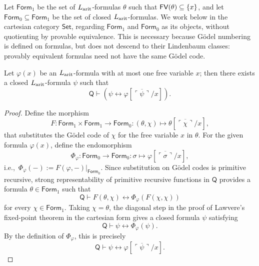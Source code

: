 \begin{notation}
    Let $\mathsf{Form}_1$ be the set of $L_{\textnormal{arit}}$-formulas $\theta$ such that $\textsf{FV}(\theta)\subseteq\{x\}$, and let $\mathsf{Form}_0\subseteq\mathsf{Form}_1$ be the set of closed $L_{\textnormal{arit}}$-formulas.
    We work below in the cartesian category $\mathsf{Set}$, regarding $\mathsf{Form}_1$ and $\mathsf{Form}_0$ as its objects, without quotienting by provable equivalence. This is necessary because Gödel numbering is defined on formulas, but does not descend to their Lindenbaum classes: provably equivalent formulas need not have the same Gödel code.
\end{notation}

\begin{theorem}
    Let $\varphi(x)$ be an $L_{\textnormal{arit}}$-formula with at most one free variable $x$; then there exists a closed $L_{\textnormal{arit}}$-formula $\psi$ such that
    \[ \mathsf Q \vdash \left(\psi \leftrightarrow \varphi[\overline{\ulcorner\psi\urcorner}/x]\right). \]
\end{theorem}

\begin{proof}
    Define the morphism
    \[ F : \mathsf{Form}_1\times\mathsf{Form}_1\to\mathsf{Form}_0 : (\theta,\chi)\mapsto\theta[\overline{\ulcorner\chi\urcorner}/x], \]
    that substitutes the Gödel code of $\chi$ for the free variable $x$ in $\theta$. For the given formula $\varphi(x)$, define the endomorphism
    \[ \Phi_\varphi : \mathsf{Form}_0\to\mathsf{Form}_0 : \sigma\mapsto\varphi[\overline{\ulcorner\sigma\urcorner}/x], \]
    i.e.,\ $\Phi_\varphi(-) := F(\varphi,-)|_{\mathsf{Form}_0}$.
    Since substitution on Gödel codes is primitive recursive, strong representability of primitive recursive functions in $\mathsf Q$ provides a formula $\theta\in\mathsf{Form}_1$ such that
    \[ \mathsf Q\vdash F(\theta,\chi)\leftrightarrow\Phi_\varphi(F(\chi,\chi)) \]
    for every $\chi\in\mathsf{Form}_1$. Taking $\chi=\theta$, the diagonal step in the proof of Lawvere's fixed-point theorem in the cartesian form gives a closed formula $\psi$ satisfying
    \[ \mathsf Q\vdash\psi\leftrightarrow\Phi_\varphi(\psi). \]
    By the definition of $\Phi_\varphi$, this is precisely
    \[ \mathsf Q\vdash\psi\leftrightarrow\varphi[\overline{\ulcorner\psi\urcorner}/x]. \]
\end{proof}

